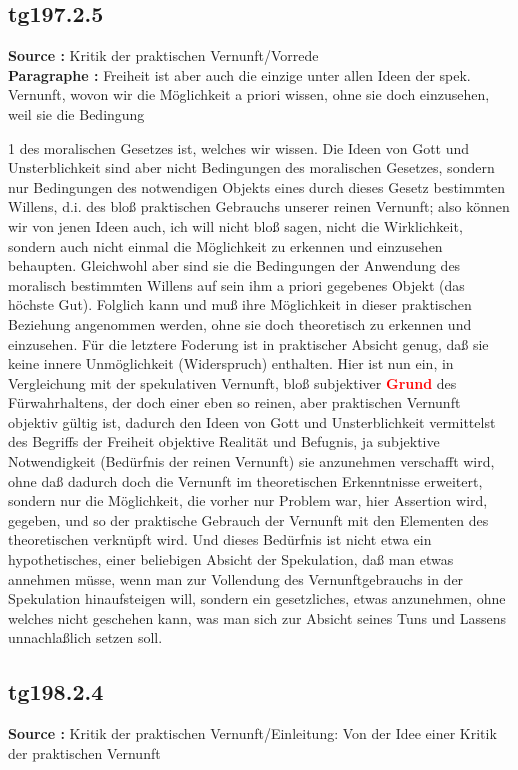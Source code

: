 \documentclass[a4paper,12pt,twoside]{book}
\newcommand{\match}[1]{\textcolor{red}{\textbf{#1}}}
\begin{document}
	\subsection*{tg197.2.5} 
	\textbf{Source : }Kritik der praktischen Vernunft/Vorrede\\  
	
	\noindent\textbf{Paragraphe : }Freiheit ist aber auch die einzige unter allen Ideen der spek. Vernunft, wovon wir die Möglichkeit a priori wissen, ohne sie doch einzusehen, weil sie die Bedingung
	
	
	1
	des moralischen Gesetzes ist, welches wir wissen. Die Ideen von Gott und Unsterblichkeit sind aber nicht Bedingungen des moralischen Gesetzes, sondern nur Bedingungen des notwendigen Objekts eines durch dieses Gesetz bestimmten Willens, d.i. des bloß praktischen Gebrauchs unserer reinen Vernunft; also können wir von jenen Ideen auch, ich will nicht bloß sagen, nicht die Wirklichkeit, sondern auch nicht einmal die Möglichkeit zu erkennen und einzusehen behaupten. Gleichwohl aber sind sie die Bedingungen der Anwendung des moralisch bestimmten Willens auf sein ihm a priori gegebenes Objekt (das höchste Gut). Folglich kann und muß ihre Möglichkeit in dieser praktischen Beziehung angenommen werden, ohne sie doch theoretisch zu erkennen und einzusehen. Für die letztere Foderung ist in praktischer Absicht genug, daß sie keine innere Unmöglichkeit (Widerspruch) enthalten. Hier ist nun ein, in Vergleichung mit der spekulativen Vernunft, bloß subjektiver \match{Grund} des Fürwahrhaltens, der doch einer eben so reinen, aber praktischen Vernunft objektiv gültig ist, dadurch den Ideen von Gott und Unsterblichkeit vermittelst des Begriffs der Freiheit objektive Realität und Befugnis, ja subjektive Notwendigkeit (Bedürfnis der reinen Vernunft) sie anzunehmen verschafft wird, ohne daß dadurch doch die  Vernunft im theoretischen Erkenntnisse erweitert, sondern nur die Möglichkeit, die vorher nur Problem war, hier Assertion wird, gegeben, und so der praktische Gebrauch der Vernunft mit den Elementen des theoretischen verknüpft wird. Und dieses Bedürfnis ist nicht etwa ein hypothetisches, einer beliebigen Absicht der Spekulation, daß man etwas annehmen müsse, wenn man zur Vollendung des Vernunftgebrauchs in der Spekulation hinaufsteigen will, sondern ein gesetzliches, etwas anzunehmen, ohne welches nicht geschehen kann, was man sich zur Absicht seines Tuns und Lassens unnachlaßlich setzen soll. 
	
	\subsection*{tg198.2.4} 
	\textbf{Source : }Kritik der praktischen Vernunft/Einleitung: Von der Idee einer Kritik der praktischen Vernunft\\  
	
\end{document}
